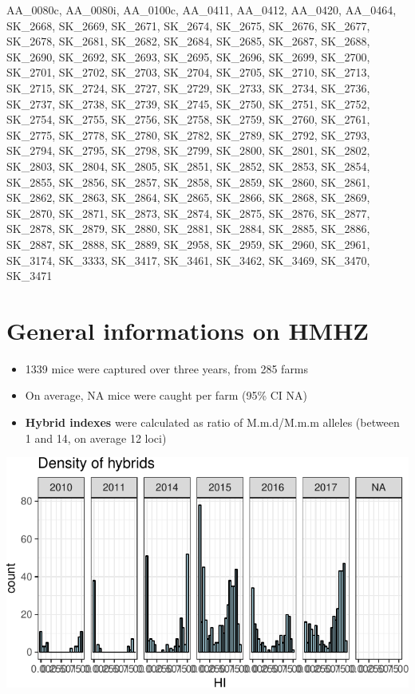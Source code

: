 \documentclass[]{article}
\let\origfigure\figure
\let\endorigfigure\endfigure
\renewenvironment{figure}[1][2] { 
    \expandafter\origfigure\expandafter[H] 
} { 
    \endorigfigure 
}
\begin{document}
AA\_0080c, AA\_0080i, AA\_0100c, AA\_0411, AA\_0412, AA\_0420, AA\_0464,
SK\_2668, SK\_2669, SK\_2671, SK\_2674, SK\_2675, SK\_2676, SK\_2677,
SK\_2678, SK\_2681, SK\_2682, SK\_2684, SK\_2685, SK\_2687, SK\_2688,
SK\_2690, SK\_2692, SK\_2693, SK\_2695, SK\_2696, SK\_2699, SK\_2700,
SK\_2701, SK\_2702, SK\_2703, SK\_2704, SK\_2705, SK\_2710, SK\_2713,
SK\_2715, SK\_2724, SK\_2727, SK\_2729, SK\_2733, SK\_2734, SK\_2736,
SK\_2737, SK\_2738, SK\_2739, SK\_2745, SK\_2750, SK\_2751, SK\_2752,
SK\_2754, SK\_2755, SK\_2756, SK\_2758, SK\_2759, SK\_2760, SK\_2761,
SK\_2775, SK\_2778, SK\_2780, SK\_2782, SK\_2789, SK\_2792, SK\_2793,
SK\_2794, SK\_2795, SK\_2798, SK\_2799, SK\_2800, SK\_2801, SK\_2802,
SK\_2803, SK\_2804, SK\_2805, SK\_2851, SK\_2852, SK\_2853, SK\_2854,
SK\_2855, SK\_2856, SK\_2857, SK\_2858, SK\_2859, SK\_2860, SK\_2861,
SK\_2862, SK\_2863, SK\_2864, SK\_2865, SK\_2866, SK\_2868, SK\_2869,
SK\_2870, SK\_2871, SK\_2873, SK\_2874, SK\_2875, SK\_2876, SK\_2877,
SK\_2878, SK\_2879, SK\_2880, SK\_2881, SK\_2884, SK\_2885, SK\_2886,
SK\_2887, SK\_2888, SK\_2889, SK\_2958, SK\_2959, SK\_2960, SK\_2961,
SK\_3174, SK\_3333, SK\_3417, SK\_3461, SK\_3462, SK\_3469, SK\_3470,
SK\_3471

\section{General informations on
HMHZ}\label{general-informations-on-hmhz}

\begin{itemize}
\item
  1339 mice were captured over three years, from 285 farms
\item
  On average, NA mice were caught per farm (95\% CI NA)
\item
  \textbf{Hybrid indexes} were calculated as ratio of M.m.d/M.m.m
  alleles (between 1 and 14, on average 12 loci)
\end{itemize}

\begin{figure}
\centering
\includegraphics{Data_Analysis_Alice_files/figure-latex/plotDensHI-1.pdf}
\caption{\label{fig:plot1}Number of animals caught along the hybrid
index}
\end{figure}
\end{document}
